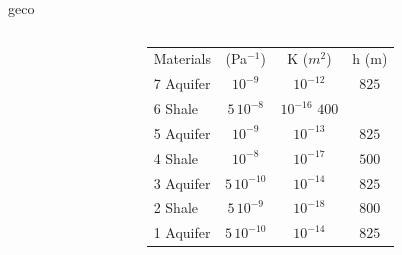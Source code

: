 \documentclass{beamer}
\begin{document}
\begin{frame}{geco}
\begin{columns}
\begin{column}{0.2\textwidth}
\end{column}
\begin{column}{0.7\textwidth}
\begin{tabular}{lccc}
Materials &  (Pa$^{-1}$) & K ($m^2$) & h (m)\\ 
7 Aquifer & $10^{-9}$ & $10^{-12} $ & $825$\\
6 Shale & $ 5 \, 10^{-8}$ & $ 10^{-16} $  $400$\\
5 Aquifer & $10^{-9}$ & $10^{-13} $ & $825$\\
4 Shale & $ 10^{-8}$ & $ 10^{-17} $ & $500$\\
3 Aquifer & $5 \, 10^{-10}$ & $10^{-14} $ & $825$\\
2 Shale & $5 \, 10^{-9}$ & $10^{-18} $ & $800$\\
1 Aquifer & $5 \, 10^{-10}$ & $10^{-14} $ & $825$\\
\end{tabular}
\end{column}
\end{columns}
\end{frame}
\end{document}

